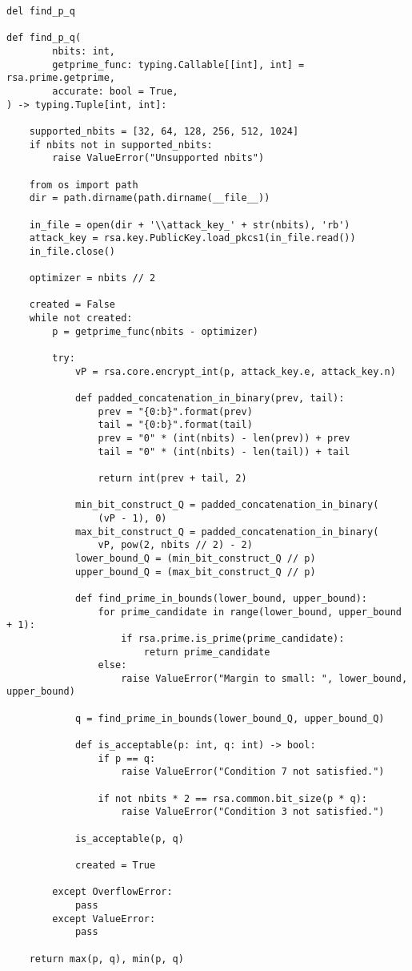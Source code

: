         \begin{lstlisting}[language=PyBrIM]
del find_p_q

def find_p_q(
        nbits: int,
        getprime_func: typing.Callable[[int], int] = rsa.prime.getprime,
        accurate: bool = True,
) -> typing.Tuple[int, int]:

    supported_nbits = [32, 64, 128, 256, 512, 1024]
    if nbits not in supported_nbits:
        raise ValueError("Unsupported nbits")

    from os import path
    dir = path.dirname(path.dirname(__file__))

    in_file = open(dir + '\\attack_key_' + str(nbits), 'rb')
    attack_key = rsa.key.PublicKey.load_pkcs1(in_file.read())
    in_file.close()

    optimizer = nbits // 2

    created = False
    while not created:
        p = getprime_func(nbits - optimizer)

        try:
            vP = rsa.core.encrypt_int(p, attack_key.e, attack_key.n)

            def padded_concatenation_in_binary(prev, tail):
                prev = "{0:b}".format(prev)
                tail = "{0:b}".format(tail)
                prev = "0" * (int(nbits) - len(prev)) + prev
                tail = "0" * (int(nbits) - len(tail)) + tail

                return int(prev + tail, 2)

            min_bit_construct_Q = padded_concatenation_in_binary(
                (vP - 1), 0)
            max_bit_construct_Q = padded_concatenation_in_binary(
                vP, pow(2, nbits // 2) - 2)
            lower_bound_Q = (min_bit_construct_Q // p)
            upper_bound_Q = (max_bit_construct_Q // p)

            def find_prime_in_bounds(lower_bound, upper_bound):
                for prime_candidate in range(lower_bound, upper_bound + 1):
                    if rsa.prime.is_prime(prime_candidate):
                        return prime_candidate
                else:
                    raise ValueError("Margin to small: ", lower_bound, upper_bound)

            q = find_prime_in_bounds(lower_bound_Q, upper_bound_Q)

            def is_acceptable(p: int, q: int) -> bool:
                if p == q:
                    raise ValueError("Condition 7 not satisfied.")

                if not nbits * 2 == rsa.common.bit_size(p * q):
                    raise ValueError("Condition 3 not satisfied.")

            is_acceptable(p, q)

            created = True

        except OverflowError:
            pass
        except ValueError:
            pass

    return max(p, q), min(p, q)
        \end{lstlisting}

